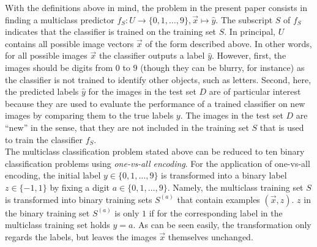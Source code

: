 With the definitions above in mind, the problem in the present paper consists in finding a multiclass predictor $f_S: U \rightarrow \{0, 1, \dots, 9\}, \vec{x} \mapsto \hat{y}$. The subscript $S$ of $f_S$ indicates that the classifier is trained on the training set $S$. In principal, $U$ contains all possible image vectors $\vec{x}$ of the form described above. In other words, for all possible images $\vec{x}$ the classifier outputs a label $\hat{y}$. However, first, the images should be digits from $0$ to $9$ (though they can be blurry, for instance) as the classifier is not trained to identify other objects, such as letters. Second, here, the predicted labels $\hat{y}$ for the images in the test set $D$ are of particular interest because they are used to evaluate the performance of a trained classifier on new images by comparing them to the true labels $y$. The images in the test set $D$ are \enquote{new} in the sense, that they are not included in the training set $S$ that is used to train the classifier $f_S$. \\

The multiclass classification problem stated above can be reduced to ten binary classification problems using \textit{one-vs-all encoding}. For the application of one-vs-all encoding, the initial label $y \in \{0, 1, \dots, 9\}$ is transformed into a binary label $z \in \{-1, 1\}$ by fixing a digit $a \in \{0, 1, \dots, 9\}$. Namely, the multiclass training set $S$ is transformed into binary training sets $S^{(a)}$ that contain examples $(\vec{x}, z)$. $z$ in the binary training set $S^{(a)}$ is only $1$ if for the corresponding label in the multiclass training set holds $y = a$. As can be seen easily, the transformation only regards the labels, but leaves the images $\vec{x}$ themselves unchanged.\\

